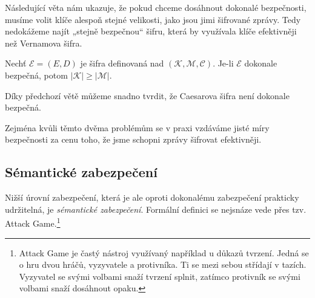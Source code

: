 \documentclass[
  program=infoi,
  biblatex,
  figures=false,
  glossaries,
  index
]{kidiplom}
\begin{document}
        Následující věta nám ukazuje, že pokud chceme dosáhnout dokonalé bezpečnosti, musíme volit klíče alespoň stejné
        velikosti, jako jsou jimi šifrované zprávy. Tedy nedokážeme najít „stejně bezpečnou“ šifru, která by
        využívala klíče efektivněji než Vernamova šifra.

        \begin{theorem}
            
            Nechť $\mathcal{E}  = (E, D)$ je šifra definovaná nad $(\mathcal{K},\mathcal{M},\mathcal{C})$.
            Je-li $\mathcal{E}$ dokonale bezpečná, potom $|\mathcal{K}| \geq |\mathcal{M}|$.
        \end{theorem}


        \medskip

        Díky předchozí větě můžeme snadno tvrdit, že Caesarova šifra není dokonale bezpečná.

        Zejména kvůli těmto dvěma problémům se v praxi vzdáváme jisté míry bezpečnosti za cenu toho, že jsme schopni zprávy šifrovat efektivněji.


    \subsection{Sémantické zabezpečení}\label{sub:semantic-security-private}

        Nižší úrovní zabezpečení, která je ale oproti dokonalému zabezpečení prakticky udržitelná, je \emph{sémantické zabezpečení}.        
        Formální definici se nejsnáze vede přes tzv. Attack Game.\footnote{Attack Game je častý nástroj využívaný například u důkazů tvrzení.
        Jedná se o hru dvou hráčů, vyzyvatele a protivníka. Ti se mezi sebou střídají v tazích.
        Vyzyvatel se svými volbami snaží tvrzení splnit, zatímco protivník se svými volbami snaží dosáhnout opaku.}
\end{document}

